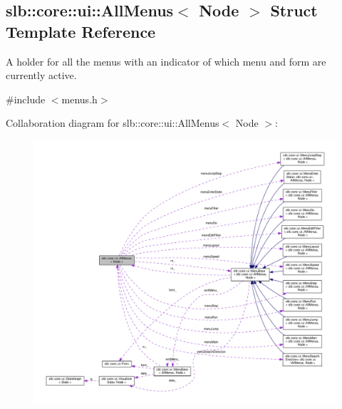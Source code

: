 \hypertarget{structslb_1_1core_1_1ui_1_1AllMenus}{}\subsection{slb\+:\+:core\+:\+:ui\+:\+:All\+Menus$<$ Node $>$ Struct Template Reference}
\label{structslb_1_1core_1_1ui_1_1AllMenus}


A holder for all the menus with an indicator of which menu and form are currently active.  




{\ttfamily \#include $<$menus.\+h$>$}



Collaboration diagram for slb\+:\+:core\+:\+:ui\+:\+:All\+Menus$<$ Node $>$\+:\nopagebreak
\begin{figure}[H]
\begin{center}
\leavevmode
\includegraphics[width=350pt]{structslb_1_1core_1_1ui_1_1AllMenus__coll__graph}
\end{center}
\end{figure}
